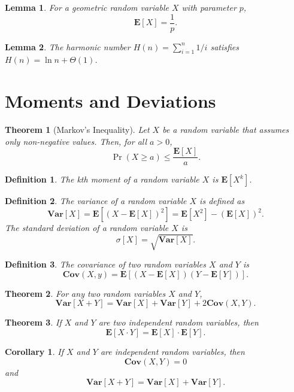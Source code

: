 \documentclass{amsart}
\newtheorem*{definition}{Definition}
\newtheorem*{theorem}{Theorem}
\newtheorem*{lemma}{Lemma}
\newtheorem*{corollary}{Corollary}
\newcommand{\E}{\mathbf{E}}
\newcommand{\Var}{\mathbf{Var}}
\newcommand{\Cov}{\mathbf{Cov}}
\begin{document}
\begin{lemma}
  For a geometric random variable $X$ with parameter $p$,
  \[
    \E[X] = \frac{1}{p}.
  \]
\end{lemma}

\begin{lemma}
  The harmonic number $H(n) = \sum_{i = 1}^n 1/i$ satisfies $H(n) = \ln n +
  \Theta(1)$.
\end{lemma}

\section{Moments and Deviations}

\begin{theorem}[Markov's Inequality]
  Let $X$ be a random variable that assumes only non-negative values. Then, for
  all $a > 0$,
  \[
    \Pr(X \geq a) \leq \frac{\E[X]}{a}.
  \]
\end{theorem}

\begin{definition}
  The kth moment of a random variable $X$ is $\E[X^k]$.
\end{definition}

\begin{definition}
  The \emph{variance} of a random variable $X$ is defined as
  \[
    \Var[X] = \E[{(X - \E[X])}^2] = \E[X^2] - {(\E[X])}^2.
  \]
  The \emph{standard deviation} of a random variable $X$ is
  \[
    \sigma[X] = \sqrt{\Var[X]}.
  \]
\end{definition}

\begin{definition}
  The \emph{covariance} of two random variables $X$ and $Y$ is
  \[
    \Cov(X, y) = \E[(X - \E[X]) (Y - \E[Y])].
  \]
\end{definition}

\begin{theorem}
  For any two random variables $X$ and $Y$,
  \[
    \Var[X + Y] = \Var[X] + \Var[Y] + 2 \Cov(X, Y).
  \]
\end{theorem}

\begin{theorem}
  If $X$ and $Y$ are two independent random variables, then
  \[
    \E[X \cdot Y] = \E[X] \cdot \E[Y].
  \]
\end{theorem}

\begin{corollary}
  If $X$ and $Y$ are independent random variables, then
  \[
    \Cov(X, Y) = 0
  \]
  and
  \[
    \Var[X + Y] = \Var[X] + \Var[Y].
  \]
\end{corollary}
\end{document}
